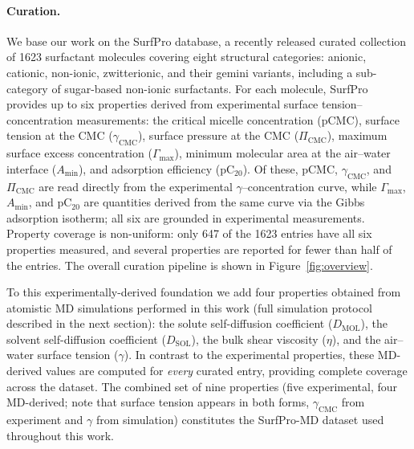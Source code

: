 \documentclass[11pt]{aime}
\begin{document}
\paragraph{Curation.}
We base our work on the SurfPro\cite{hodl_surfpro_2025} database, a recently released curated collection of 1623 surfactant molecules covering eight structural categories: anionic, cationic, non-ionic, zwitterionic, and their gemini variants, including a sub-category of sugar-based non-ionic surfactants.
For each molecule, SurfPro provides up to six properties derived from experimental surface tension--concentration measurements: the critical micelle concentration (pCMC), surface tension at the CMC ($\gamma_{\mathrm{CMC}}$), surface pressure at the CMC ($\Pi_{\mathrm{CMC}}$), maximum surface excess concentration ($\Gamma_{\max}$), minimum molecular area at the air--water interface ($A_{\min}$), and adsorption efficiency (pC$_{20}$).
Of these, pCMC, $\gamma_{\mathrm{CMC}}$, and $\Pi_{\mathrm{CMC}}$ are read directly from the experimental $\gamma$--concentration curve, while $\Gamma_{\max}$, $A_{\min}$, and pC$_{20}$ are quantities derived from the same curve via the Gibbs adsorption isotherm;
all six are grounded in experimental measurements.
Property coverage is non-uniform: only 647 of the 1623 entries have all six properties measured, and several properties are reported for fewer than half of the entries.
The overall curation pipeline is shown in Figure~\ref{fig:overview}.

To this experimentally-derived foundation we add four properties obtained from atomistic MD simulations performed in this work (full simulation protocol described in the next section): the solute self-diffusion coefficient ($D_{\mathrm{MOL}}$), the solvent self-diffusion coefficient ($D_{\mathrm{SOL}}$), the bulk shear viscosity ($\eta$), and the air--water surface tension ($\gamma$).
In contrast to the experimental properties, these MD-derived values are computed for \textit{every} curated entry, providing complete coverage across the dataset.
The combined set of nine properties (five experimental, four MD-derived;
note that surface tension appears in both forms, $\gamma_{\mathrm{CMC}}$ from experiment and $\gamma$ from simulation) constitutes the SurfPro-MD dataset used throughout this work.
\end{document}
